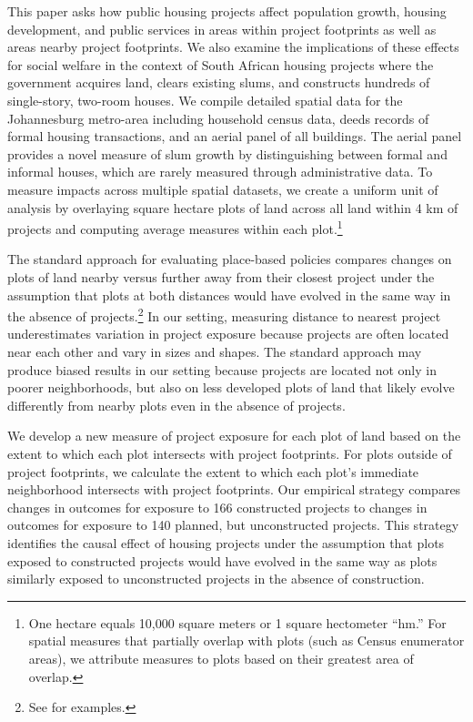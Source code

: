 \documentclass[12pt]{article}
\begin{document}
This paper asks how public housing projects affect population growth, housing development, and public services in areas within project footprints as well as areas nearby project footprints.  We also examine the implications of these effects for social welfare in the context of South African housing projects where the government acquires land, clears existing slums, and constructs hundreds of single-story, two-room houses.  We compile detailed spatial data for the Johannesburg metro-area including household census data, deeds records of formal housing transactions, and an aerial panel of all buildings.  The aerial panel provides a novel measure of slum growth by distinguishing between formal and informal houses, which are rarely measured through administrative data.  To measure impacts across multiple spatial datasets, we create a uniform unit of analysis by overlaying square hectare plots of land across all land within 4 km of projects and computing average measures within each plot.\footnote{One hectare equals 10,000 square meters or 1 square hectometer ``hm.''  For spatial measures that partially overlap with plots (such as Census enumerator areas), we attribute measures to plots based on their greatest area of overlap.}

The standard approach for evaluating place-based policies compares changes on plots of land nearby versus further away from their closest project under the assumption that plots at both distances would have evolved in the same way in the absence of projects.\footnote{See \cite{diamond2019wants,rossi2010housing,hornbeck2017creative} for examples.}  In our setting, measuring distance to nearest project underestimates variation in project exposure because projects are often located near each other and vary in sizes and shapes.  The standard approach may produce biased results in our setting because projects are located not only in poorer neighborhoods, but also on less developed plots of land that likely evolve differently from nearby plots even in the absence of projects.

We develop a new measure of project exposure for each plot of land based on the extent to which each plot intersects with project footprints.  For plots outside of project footprints, we calculate the extent to which each plot's immediate neighborhood intersects with project footprints.  Our empirical strategy compares changes in outcomes for exposure to 166 constructed projects to changes in outcomes for exposure to 140 planned, but unconstructed projects.  This strategy identifies the causal effect of housing projects under the assumption that plots exposed to constructed projects would have evolved in the same way as plots similarly exposed to unconstructed projects in the absence of construction.  
\end{document}
